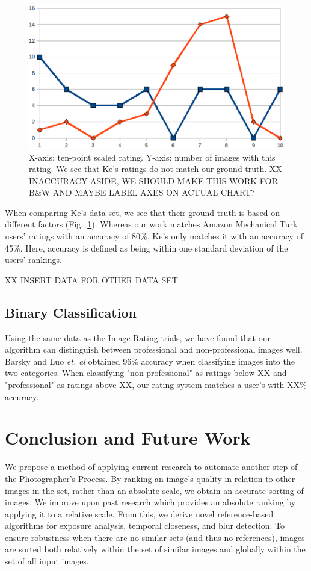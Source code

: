 \documentclass[twocolumn]{article}
\begin{document}
\begin{figure}
  \centering
    \includegraphics[scale=0.40,clip]{ke_vs_us.eps}
  \caption{X-axis: ten-point scaled rating.  Y-axis: number of images with this rating. We see that Ke's ratings do not match our ground truth. XX INACCURACY ASIDE, WE SHOULD MAKE THIS WORK FOR B\&W AND MAYBE LABEL AXES ON ACTUAL CHART?}
  \label{fig:ke_vs_us}
\end{figure}
When comparing Ke's data set, we see that their ground truth is based on different factors (Fig.~\ref{fig:ke_vs_us}). Whereas our work matches Amazon Mechanical Turk users' ratings with an accuracy of 80\%, Ke's only matches it with an accuracy of 45\%. Here, accuracy is defined as being within one standard deviation of the users' rankings.

XX INSERT DATA FOR OTHER DATA SET

\subsection{Binary Classification} Using the same data as the Image Rating trials, we have found that our algorithm can distinguish between professional and non-professional images well. Barsky \cite{Yeh:2010:PPR:1873951.1873963} and Luo \emph{et. al}\cite{springerlink:10.1007/978-3-540-88690-7_29} obtained 96\% accuracy when classifying images into the two categories. When classifying "non-professional" as ratings below XX and "professional" as ratings above XX, our rating system matches a user's with XX\% accuracy.

\section{Conclusion and Future Work}
We propose a method of applying current research to automate another step of the Photographer's Process. By ranking an image's quality in relation to other images in the set, rather than an absolute scale, we obtain an accurate sorting of images. We improve upon past research which provides an absolute ranking by applying it to a relative scale. From this, we derive novel reference-based algorithms for exposure analysis, temporal closeness, and blur detection. To ensure robustness when there are no similar sets (and thus no references), images are sorted both relatively within the set of similar images and globally within the set of all input images.
\end{document}
